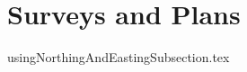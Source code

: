 \documentclass[class=book]{standalone}
\begin{document}
\ifstandalone
\maketitle %
\clearpage
\tableofcontents %
\fi

\section{Surveys and Plans}

{usingNorthingAndEastingSubsection.tex}
\end{document}
